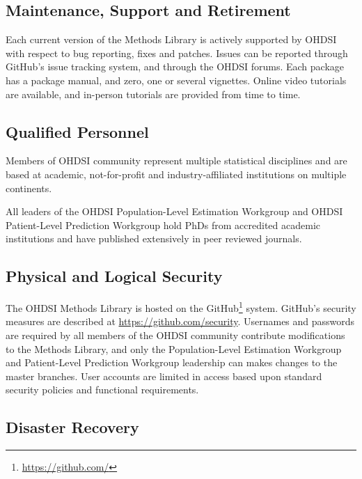 \documentclass[11pt]{book}
\let\rmarkdownfootnote\footnote%
\def\footnote{\protect\rmarkdownfootnote}
\theoremstyle{definition}
\theoremstyle{definition}
\theoremstyle{definition}
\theoremstyle{remark}
\begin{document}
\hypertarget{maintenance-support-and-retirement}{%
\subsection{Maintenance, Support and Retirement}\label{maintenance-support-and-retirement}}

Each current version of the Methods Library is actively supported by OHDSI with respect to bug reporting, fixes and patches. Issues can be reported through GitHub's issue tracking system, and through the OHDSI forums. Each package has a package manual, and zero, one or several vignettes. Online video tutorials are available, and in-person tutorials are provided from time to time.

\hypertarget{qualified-personnel}{%
\subsection{Qualified Personnel}\label{qualified-personnel}}

Members of OHDSI community represent multiple statistical disciplines and are based at academic, not-for-profit and industry-affiliated institutions on multiple continents.

All leaders of the OHDSI Population-Level Estimation Workgroup and OHDSI Patient-Level Prediction Workgroup hold PhDs from accredited academic institutions and have published extensively in peer reviewed journals.

\hypertarget{physical-and-logical-security}{%
\subsection{Physical and Logical Security}\label{physical-and-logical-security}}

The OHDSI Methods Library is hosted on the GitHub\footnote{\url{https://github.com/}} system. GitHub's security measures are described at \url{https://github.com/security}. Usernames and passwords are required by all members of the OHDSI community contribute modifications to the Methods Library, and only the Population-Level Estimation Workgroup and Patient-Level Prediction Workgroup leadership can makes changes to the master branches. User accounts are limited in access based upon standard security policies and functional requirements.

\hypertarget{disaster-recovery}{%
\subsection{Disaster Recovery}\label{disaster-recovery}}
\end{document}
